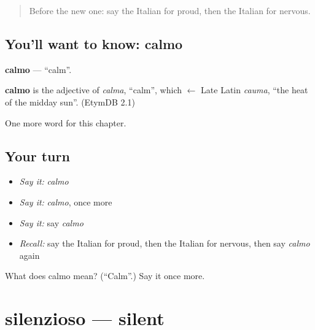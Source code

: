 \label{lesson:IT-C218-calmo}



\begin{quote}
Before the new one: say the Italian for proud, then the Italian for nervous.
\end{quote}

\subsection*{You'll want to know: calmo}
\textbf{calmo} — \textquotedblleft{}calm\textquotedblright{}.

\begin{cousinweb}
\textbf{calmo} is the adjective of \emph{calma}, \textquotedblleft{}calm\textquotedblright{}, which $\leftarrow$ Late Latin \emph{cauma}, \textquotedblleft{}the heat of the midday sun\textquotedblright{}. (EtymDB 2.1)
\end{cousinweb}

\begin{grammarlens}[title={What you've built}]
One more word for this chapter.
\end{grammarlens}

\subsection*{Your turn}
\begin{itemize}
\raggedright
  \item \emph{Say it:} \emph{calmo}
  \item \emph{Say it:} \emph{calmo}, once more
  \item \emph{Say it:} say \emph{calmo}
  \item \emph{Recall:} say the Italian for proud, then the Italian for nervous, then say \emph{calmo} again
\end{itemize}

\begin{tcolorbox}[breakable,colback=teal!4,colframe=teal!35!black,title={Before you move on}]
What does calmo mean? (\textquotedblleft{}Calm\textquotedblright{}.) Say it once more.
\end{tcolorbox}
\section[silenzioso]{silenzioso — silent}

\label{lesson:IT-C218-silenzioso}



